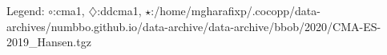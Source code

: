 Legend: {\color{NavyBlue}$\circ$}:cma1, {\color{Magenta}$\diamondsuit$}:ddcma1, {\color{Orange}$\star$}:/home/mgharafixp/.cocopp/data-archives/numbbo.github.io/data-archive/data-archive/bbob/2020/CMA-ES-2019\_Hansen.tgz